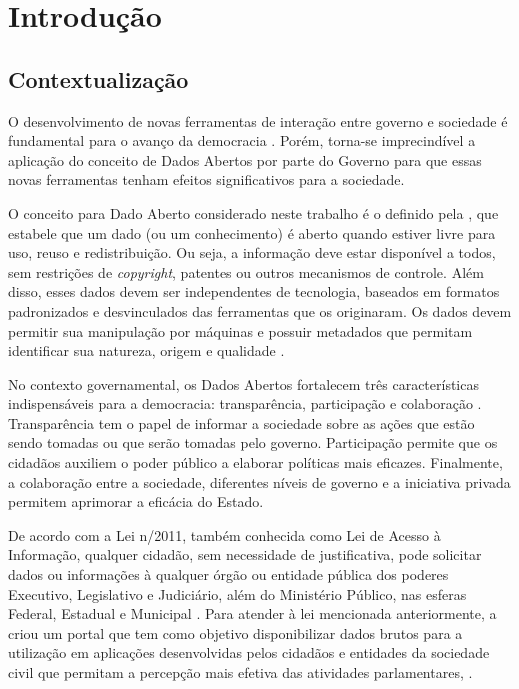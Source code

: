\chapter{Introdução}

\section{Contextualização}
\label{sec:contextualização}

O desenvolvimento de novas ferramentas de interação entre governo e sociedade é fundamental para o avanço da democracia \cite{consegi2011}. Porém, torna-se imprecindível a aplicação do conceito de Dados Abertos por parte do Governo para que essas novas ferramentas tenham efeitos significativos para a sociedade.

O conceito para Dado Aberto considerado neste trabalho é o definido pela , que estabele que um dado (ou um conhecimento) é aberto quando estiver livre para uso, reuso e redistribuição. Ou seja, a informação deve estar disponível a todos, sem restrições de \textit{copyright}, patentes ou outros mecanismos de controle. Além disso, esses dados devem ser independentes de tecnologia, baseados em formatos padronizados e desvinculados das ferramentas que os originaram. Os dados devem permitir sua manipulação por máquinas e possuir metadados que permitam identificar sua natureza, origem e qualidade \cite{diniz2010}.

No contexto governamental, os Dados Abertos fortalecem três características indispensáveis para a democracia: transparência, participação e colaboração \cite{consegi2011}. Transparência tem o papel de informar a sociedade sobre as ações que estão sendo tomadas ou que serão tomadas pelo governo. Participação permite que os cidadãos auxiliem o poder público a elaborar políticas mais eficazes. Finalmente, a colaboração entre a sociedade, diferentes níveis de governo e a iniciativa privada permitem aprimorar a eficácia do Estado.

De acordo com a Lei n/2011, também conhecida como Lei de Acesso à Informação, qualquer cidadão, sem necessidade de justificativa, pode solicitar dados ou informações à qualquer órgão ou entidade pública dos poderes Executivo, Legislativo e Judiciário, além do Ministério Público, nas esferas Federal, Estadual e Municipal \cite{lei_acesso_informacao}. Para atender à lei mencionada anteriormente, a  criou um portal que tem como objetivo disponibilizar dados brutos para a utilização em aplicações desenvolvidas pelos cidadãos e entidades da sociedade civil que permitam a percepção mais efetiva das atividades parlamentares, .

